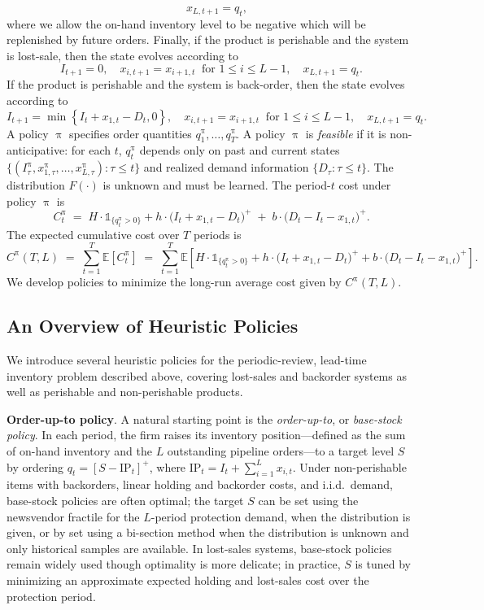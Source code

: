 \documentclass[mnsc,nonblindrev]{informs3_hide}
\newcommand{\policy}{\ensuremath{\uppi}}
\begin{document}
\begin{APPENDICES}
\[\quad x_{L,t+1} = q_t,
\]
where we allow the on-hand inventory level to be negative which will be replenished by future orders. Finally, if the product is perishable and the system is lost-sale, then the state evolves according to
\[
I_{t+1} = 0, 
\quad x_{i,t+1} = x_{i+1,t} \ \text{ for } 1 \le i \le L-1, 
\quad x_{L,t+1} = q_t.
\]
If the product is perishable and the system is back-order, then the state evolves according to
\[
I_{t+1} = \min\left\{ I_t + x_{1,t} - D_t, 0  \right\}, 
\quad x_{i,t+1} = x_{i+1,t} \ \text{ for } 1 \le i \le L-1, 
\quad x_{L,t+1} = q_t.
\]
A policy $\policy$ specifies order quantities $q_1^\policy, \ldots, q_T^\policy$. A policy $\policy$ is \emph{feasible} if it is non-anticipative: for each $t$, $q_t^\policy$ depends only on past and current states $\{(I_\tau^\policy, x_{1,\tau}^\policy, \ldots, x_{L,\tau}^\policy): \tau \le t\}$ and realized demand information $\{D_{\tau}: \tau \le t\}$. The distribution $F(\cdot)$ is unknown and must be learned.
The period-$t$ cost under policy $\policy$ is
\[
C_t^\policy \;=\; H\cdot \mathds{1}_{\{q^\policy_t>0\}} + h \cdot \big(I_t + x_{1,t} - D_t\big)^+ \;+\; b \cdot \big(D_t - I_t - x_{1,t}\big)^+.
\]
The expected cumulative cost over $T$ periods is
\[
C^\policy(T, L) \;=\; \sum_{t=1}^T \mathds{E}[C_t^\policy]
\;=\; \sum_{t=1}^T \mathds{E}\!\left[H\cdot \mathds{1}_{\{q^\policy_t>0\}} + h \cdot \big(I_t + x_{1,t} - D_t\big)^+ + b \cdot \big(D_t - I_t - x_{1,t}\big)^+\right].
\]
We develop policies to minimize the long-run average cost given by $C^\policy(T, L)$.

\subsection{An Overview of Heuristic Policies}
We introduce several heuristic policies for the periodic-review, lead-time inventory problem described above, covering lost-sales and backorder systems as well as perishable and non-perishable products. 

\noindent\textbf{Order-up-to policy}.
A natural starting point is the \textit{order-up-to}, or \textit{base-stock policy}. In each period, the firm raises its inventory position---defined as the sum of on-hand inventory and the $L$ outstanding pipeline orders---to a target level $S$ by ordering $q_t = [S - \mathrm{IP}_t]^+$, where $\mathrm{IP}_t = I_t + \sum_{i=1}^L x_{i,t}$. Under non-perishable items with backorders, linear holding and backorder costs, and i.i.d.\ demand, base-stock policies are often optimal; the target $S$ can be set using the newsvendor fractile for the $L$-period protection demand, when the distribution is given, or by set using a bi-section method when the distribution is unknown and only historical samples are available. In lost-sales systems, base-stock policies remain widely used though optimality is more delicate; in practice, $S$ is tuned by minimizing an approximate expected holding and lost-sales cost over the protection period.


\end{APPENDICES}
\end{document}
